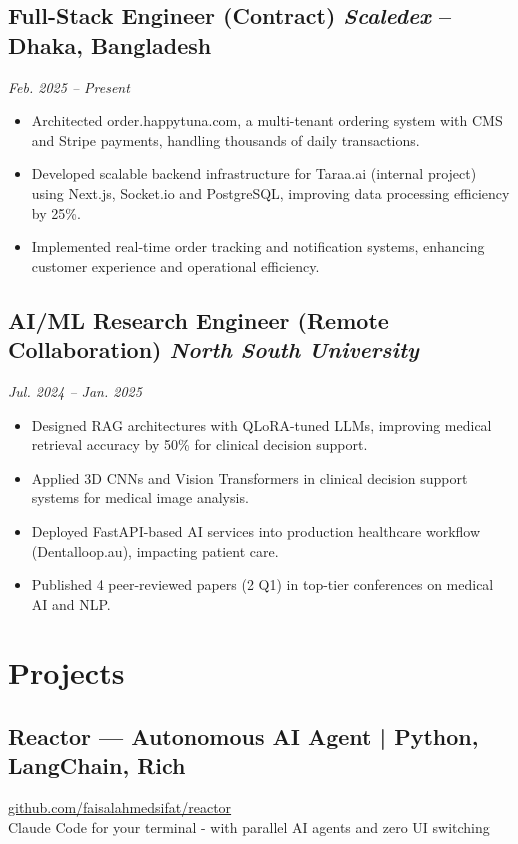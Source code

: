 \documentclass[letterpaper,10pt]{article}
\begin{document}
\subsection*{\textbf{Full-Stack Engineer (Contract)} \hfill \textit{Scaledex} -- Dhaka, Bangladesh}
\textit{Feb. 2025 – Present}
\begin{itemize}
    \item Architected order.happytuna.com, a multi-tenant ordering system with CMS and Stripe payments, handling thousands of daily transactions.
    \item Developed scalable backend infrastructure for Taraa.ai (internal project) using Next.js, Socket.io and PostgreSQL, improving data processing efficiency by 25\%.
    \item Implemented real-time order tracking and notification systems, enhancing customer experience and operational efficiency.
\end{itemize}

\subsection*{\textbf{AI/ML Research Engineer (Remote Collaboration)} \hfill \textit{North South University}}
\textit{Jul. 2024 – Jan. 2025}
\begin{itemize}
    \item Designed RAG architectures with QLoRA-tuned LLMs, improving medical retrieval accuracy by 50\% for clinical decision support.
    \item Applied 3D CNNs and Vision Transformers in clinical decision support systems for medical image analysis.
    \item Deployed FastAPI-based AI services into production healthcare workflow (Dentalloop.au), impacting patient care.
    \item Published 4 peer-reviewed papers (2 Q1) in top-tier conferences on medical AI and NLP.
\end{itemize}

\section*{Projects}

\subsection*{\textbf{Reactor — Autonomous AI Agent} | Python, LangChain, Rich}
\href{https://github.com/faisalahmedsifat/reactor}{github.com/faisalahmedsifat/reactor} \\
\RaggedRight
Claude Code for your terminal - with parallel AI agents and zero UI switching
\end{document}
